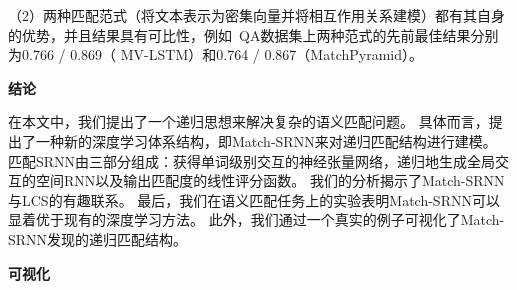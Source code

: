 （2）两种匹配范式（将文本表示为密集向量并将相互作用关系建模）都有其自身的优势，并且结果具有可比性，例如~QA数据集上两种范式的先前最佳结果分别为0.766 / 0.869（ MV-LSTM）和0.764 / 0.867（MatchPyramid）。

\textbf{结论}

在本文中，我们提出了一个递归思想来解决复杂的语义匹配问题。
具体而言，提出了一种新的深度学习体系结构，即Match-SRNN来对递归匹配结构进行建模。 匹配SRNN由三部分组成：获得单词级别交互的神经张量网络，递归地生成全局交互的空间RNN以及输出匹配度的线性评分函数。 我们的分析揭示了Match-SRNN与LCS的有趣联系。 最后，我们在语义匹配任务上的实验表明Match-SRNN可以显着优于现有的深度学习方法。 此外，我们通过一个真实的例子可视化了Match-SRNN发现的递归匹配结构。

\textbf{可视化}
